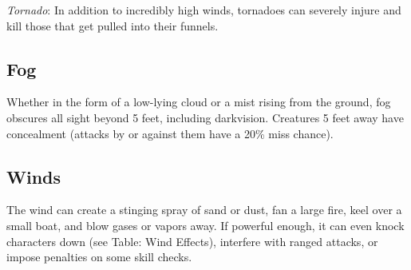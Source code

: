 \textit{Tornado}: In addition to incredibly high winds, tornadoes can severely injure and kill those that get pulled into their funnels.
				
\subsection{Fog}

				
Whether in the form of a low-lying cloud or a mist rising from the ground, fog obscures all sight beyond 5 feet, including darkvision. Creatures 5 feet away have concealment (attacks by or against them have a 20\% miss chance).
				
\subsection{Winds}

				
The wind can create a stinging spray of sand or dust, fan a large fire, keel over a small boat, and blow gases or vapors away. If powerful enough, it can even knock characters down (see Table: Wind Effects), interfere with ranged attacks, or impose penalties on some skill checks.


